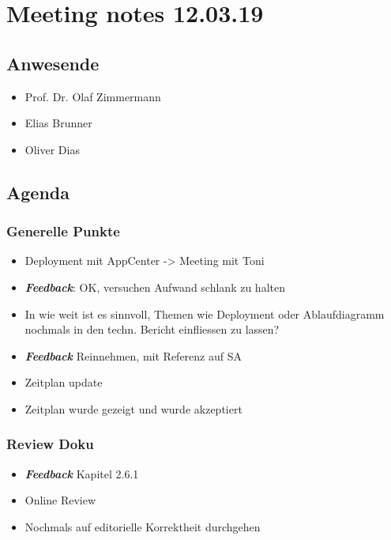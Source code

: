 \hypertarget{meeting-notes-120319}{%
\section*{Meeting notes 12.03.19}\label{meeting-notes-120319}}

\hypertarget{anwesende}{%
\subsection*{Anwesende}\label{anwesende}}

\begin{itemize}

\item
  Prof. Dr. Olaf Zimmermann
\item
  Elias Brunner
\item
  Oliver Dias
\end{itemize}

\hypertarget{agenda}{%
\subsection*{Agenda}\label{agenda}}

\hypertarget{generelle-punkte}{%
\subsubsection*{Generelle Punkte}\label{generelle-punkte}}

\begin{itemize}
\item
  Deployment mit AppCenter -\textgreater{} Meeting mit Toni
\item
  \emph{\textbf{Feedback}}: OK, versuchen Aufwand schlank zu halten
\item
  In wie weit ist es sinnvoll, Themen wie Deployment oder Ablaufdiagramm
  nochmals in den techn. Bericht einfliessen zu lassen?
\item
  \emph{\textbf{Feedback}} Reinnehmen, mit Referenz auf SA
\item
  Zeitplan update
\item
  Zeitplan wurde gezeigt und wurde akzeptiert
\end{itemize}

\hypertarget{review-doku}{%
\subsubsection*{Review Doku}\label{review-doku}}

\begin{itemize}

\item
  \emph{\textbf{Feedback}} Kapitel 2.6.1
\item
  Online Review
\item
  Nochmals auf editorielle Korrektheit durchgehen
\end{itemize}

